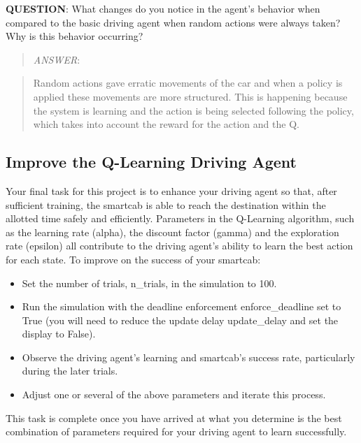 \documentclass[11pt]{article}
\begin{document}
\textbf{QUESTION}: What changes do you notice in the agent's behavior
when compared to the basic driving agent when random actions were always
taken? Why is this behavior occurring?

    \begin{quote}
\emph{ANSWER}:
\end{quote}

\begin{quote}
Random actions gave erratic movements of the car and when a policy is
applied these movements are more structured. This is happening because
the system is learning and the action is being selected following the
policy, which takes into account the reward for the action and the Q.
\end{quote}

    \subsection{Improve the Q-Learning Driving
Agent}\label{improve-the-q-learning-driving-agent}

Your final task for this project is to enhance your driving agent so
that, after sufficient training, the smartcab is able to reach the
destination within the allotted time safely and efficiently. Parameters
in the Q-Learning algorithm, such as the learning rate (alpha), the
discount factor (gamma) and the exploration rate (epsilon) all
contribute to the driving agent's ability to learn the best action for
each state. To improve on the success of your smartcab:

\begin{itemize}
\itemsep1pt\parskip0pt
\item
  Set the number of trials, n\_trials, in the simulation to 100.
\item
  Run the simulation with the deadline enforcement enforce\_deadline set
  to True (you will need to reduce the update delay update\_delay and
  set the display to False).
\item
  Observe the driving agent's learning and smartcab's success rate,
  particularly during the later trials.
\item
  Adjust one or several of the above parameters and iterate this
  process.
\end{itemize}

This task is complete once you have arrived at what you determine is the
best combination of parameters required for your driving agent to learn
successfully.
\end{document}
